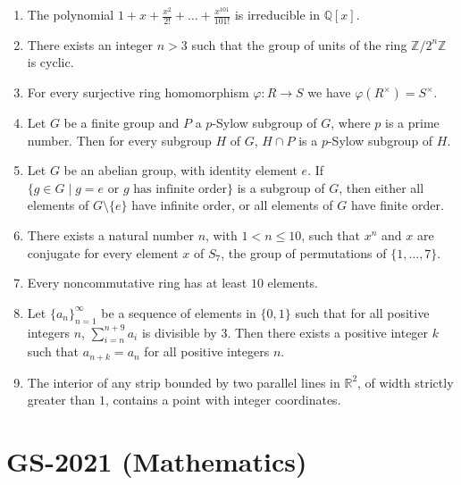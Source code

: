 \documentclass[11pt, a4paper]{article}
\begin{document}
\begin{enumerate}
  \[
    2^{\sqrt{n}} \le |\operatorname{tr}(A^n)| \le 2020 \cdot 2^{\sqrt{n}}.
  \]
  \item The polynomial $1 + x + \frac{x^2}{2!} + \dots + \frac{x^{101}}{101!}$ is irreducible in $\mathbb{Q}[x]$.
  \item There exists an integer $n > 3$ such that the group of units of the ring $\mathbb{Z}/2^n\mathbb{Z}$ is cyclic.
  \item For every surjective ring homomorphism $\varphi: R \to S$ we have $\varphi(R^\times) = S^\times$.
  \item Let $G$ be a finite group and $P$ a $p$-Sylow subgroup of $G$, where $p$ is a prime number. Then for every subgroup $H$ of $G$, $H \cap P$ is a $p$-Sylow subgroup of $H$.
  \item Let $G$ be an abelian group, with identity element $e$. If $\{g \in G \mid g = e \text{ or } g \text{ has infinite order}\}$ is a subgroup of $G$, then either all elements of $G \setminus \{e\}$ have infinite order, or all elements of $G$ have finite order.
  \item There exists a natural number $n$, with $1 < n \le 10$, such that $x^n$ and $x$ are conjugate for every element $x$ of $S_7$, the group of permutations of $\{1, \dots, 7\}$.
  \item Every noncommutative ring has at least $10$ elements.
  \item Let $\{a_n\}_{n=1}^\infty$ be a sequence of elements in $\{0, 1\}$ such that for all positive integers $n$, $\sum_{i=n}^{n+9} a_i$ is divisible by $3$. Then there exists a positive integer $k$ such that $a_{n+k} = a_n$ for all positive integers $n$.
  \item The interior of any strip bounded by two parallel lines in $\mathbb{R}^2$, of width strictly greater than $1$, contains a point with integer coordinates.
\end{enumerate}

\newpage

\section{GS-2021 (Mathematics)}
\end{document}
